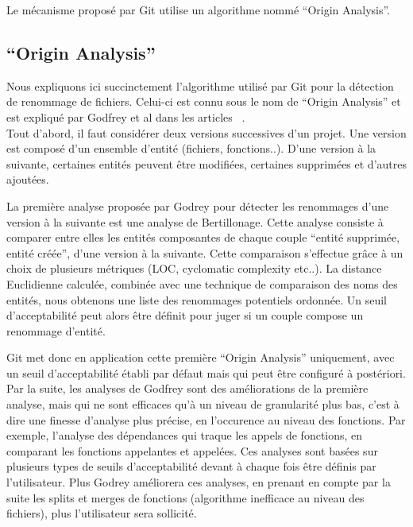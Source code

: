 Le mécanisme proposé par Git utilise un algorithme nommé ``Origin Analysis''.

\subsection{``Origin Analysis''}

Nous expliquons ici succinctement l'algorithme utilisé par Git pour la détection de renommage de fichiers. Celui-ci est connu sous le nom de ``Origin Analysis'' et est expliqué par Godfrey et al dans les articles ~\cite{tu_integrated_2002,godfrey_tracking_2002,godfrey_using_2005}.\\

Tout d'abord, il faut considérer deux versions successives d'un projet. Une version est composé d'un ensemble d'entité (fichiers, fonctions..). D'une version à la suivante, certaines entités peuvent être modifiées, certaines supprimées et d'autres ajoutées.

La première analyse proposée par Godrey pour détecter les renommages d'une version à la suivante est une analyse de Bertillonage. Cette analyse consiste à comparer entre elles les entités composantes de chaque couple ``entité supprimée, entité créée'', d'une version à la suivante. Cette comparaison s'effectue grâce à un choix de plusieurs métriques (LOC, cyclomatic complexity etc..). La distance Euclidienne calculée, combinée avec une technique de comparaison des noms des entités, nous obtenons une liste des renommages potentiels ordonnée. Un seuil d'acceptabilité peut alors être définit pour juger si un couple compose un renommage d'entité.

Git met donc en application cette première ``Origin Analysis'' uniquement, avec un seuil d'acceptabilité établi par défaut mais qui peut être configuré à postériori.\\

Par la suite, les analyses de Godfrey sont des améliorations de la première analyse, mais qui ne sont efficaces qu'à un niveau de granularité plus bas, c'est à dire une finesse d'analyse plus précise, en l'occurence au niveau des fonctions. Par exemple, l'analyse des dépendances qui traque les appels de fonctions, en comparant les fonctions appelantes et appelées. Ces analyses sont basées sur plusieurs types de seuils d'acceptabilité devant à chaque fois être définis par l'utilisateur. Plus Godrey améliorera ces analyses, en prenant en compte par la suite les splits et merges de fonctions (algorithme inefficace au niveau des fichiers), plus l'utilisateur sera sollicité.\\


